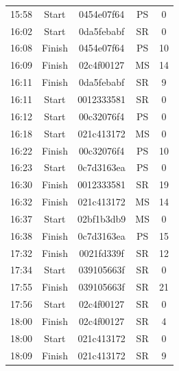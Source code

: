 \begin{table}[htpb]
{\begin{tabular}{cc|cc|c}
        15:58 & Start   & 0454e07f64 & PS  & 0  \\
        16:02 & Start   & 0da5febabf & SR  & 0  \\
        16:08 & Finish  & 0454e07f64 & PS  & 10 \\
        16:09 & Finish  & 02c4f00127 & MS  & 14 \\
        16:11 & Finish  & 0da5febabf & SR  & 9  \\
        16:11 & Start   & 0012333581 & SR  & 0  \\
        16:12 & Start   & 00c32076f4 & PS  & 0  \\
        16:18 & Start   & 021c413172 & MS  & 0  \\
        16:22 & Finish  & 00c32076f4 & PS  & 10 \\
        16:23 & Start   & 0c7d3163ea & PS  & 0  \\
        16:30 & Finish  & 0012333581 & SR  & 19 \\
        16:32 & Finish  & 021c413172 & MS  & 14 \\
        16:37 & Start   & 02bf1b3db9 & MS  & 0  \\
        16:38 & Finish  & 0c7d3163ea & PS  & 15 \\
        17:32 & Finish  & 0021fd339f & SR  & 12 \\
        17:34 & Start   & 039105663f & SR  & 0  \\
        17:55 & Finish  & 039105663f & SR  & 21 \\
        17:56 & Start   & 02c4f00127 & SR  & 0  \\
        18:00 & Finish  & 02c4f00127 & SR  & 4  \\
        18:00 & Start   & 021c413172 & SR  & 0  \\
        18:09 & Finish  & 021c413172 & SR  & 9  \\
    \end{tabular}
}
\label{tab:timetable-details}
\end{table}


